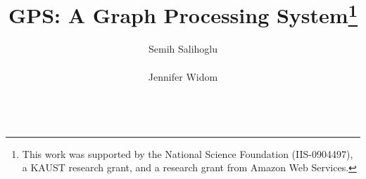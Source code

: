 \documentclass{vldb}
\begin{document}

\title{GPS: A Graph Processing System\thanks{This work was supported by the National Science Foundation (IIS-0904497), a KAUST research grant, and a research grant from Amazon Web Services.}}



%
%
%
%

\author{
\alignauthor
Semih Salihoglu\\
       \\
\alignauthor
Jennifer Widom\\
       \\
}
\end{document}
